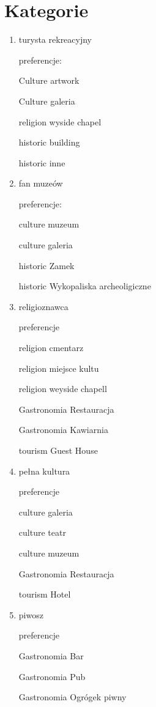 \documentclass[]{article}
\begin{document}
\section{Kategorie}
\begin{enumerate}
    \item turysta rekreacyjny
    
    preferencje:
    
        Culture artwork
        
        Culture galeria
        
        religion wyside chapel
        
        historic building
        
        historic inne
        
    \item fan muzeów
    
    preferencje:
    
        culture muzeum
        
        culture galeria
        
        historic Zamek
        
        historic Wykopaliska archeoligiczne
        
    \item religioznawca
    
    preferencje
    
        religion cmentarz
        
        religion miejsce kultu
        
        religion weyside chapell
        
        Gastronomia Restauracja
        
        Gastronomia Kawiarnia
        
        tourism Guest House
        
    \item pełna kultura
    
    preferencje
    
        culture galeria
        
        culture teatr
        
        culture muzeum
        
        Gastronomia Restauracja
        
        tourism Hotel
        
    \item piwosz
    
        preferencje
        
            Gastronomia Bar
            
            Gastronomia Pub
            
            Gastronomia Ogrógek piwny
            
    
\end{enumerate}
\end{document}
